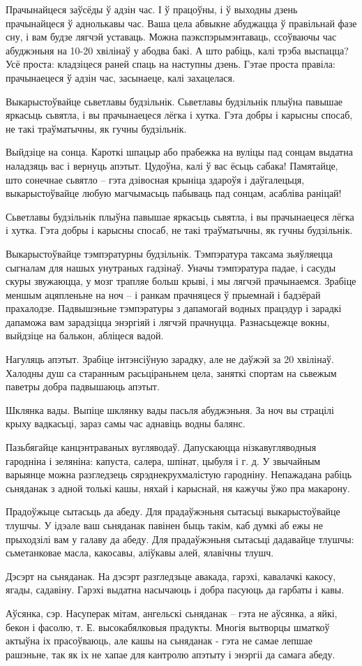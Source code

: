 Прачынайцеся заўсёды ў адзін час.
І ў працоўны, і ў выходны дзень прачынайцеся ў аднолькавы час. Ваша цела абвыкне абуджацца ў правільнай фазе сну, і вам будзе лягчэй уставаць. Можна паэкспэрымэнтаваць, ссоўваючы час абуджэньня на 10-20 хвілінаў у абодва бакі. А што рабіць, калі трэба выспацца? Усё проста: кладзіцеся раней спаць на наступны дзень. Гэтае проста правіла: прачынаецеся ў адзін час, засынаеце, калі захацелася.

Выкарыстоўвайце сьветлавы будзільнік.
Сьветлавы будзільнік плыўна павышае яркасьць сьвятла, і вы прачынаецеся лёгка і хутка. Гэта добры і карысны спосаб, не такі траўматычны, як гучны будзільнік.

Выйдзіце на сонца.
Кароткі шпацыр або прабежка на вуліцы пад сонцам выдатна наладзяць вас і вернуць апэтыт. Цудоўна, калі ў вас ёсьць сабака! Памятайце, што сонечнае сьвятло – гэта дзівосная крыніца здароўя і даўгалецьця, выкарыстоўвайце любую магчымасьць пабываць пад сонцам, асабліва раніцай!

Сьветлавы будзільнік плыўна павышае яркасьць сьвятла, і вы прачынаецеся лёгка і хутка. Гэта добры і карысны спосаб, не такі траўматычны, як гучны будзільнік.

Выкарыстоўвайце тэмпэратурны будзільнік.
Тэмпэратура таксама зьяўляецца сыгналам для нашых унутраных гадзінаў. Уначы тэмпэратура падае, і сасуды скуры звужаюцца, у мозг трапляе больш крыві, і мы лягчэй прачынаемся. Зрабіце меншым ацяпленьне на ноч – і ранкам прачняцеся ў прыемнай і бадзёрай прахалодзе. Падвышэньне тэмпэратуры з дапамогай водных працэдур і зарадкі дапаможа вам зарадзіцца энэргіяй і лягчэй прачнуцца. Разнасьцежце вокны, выйдзіце на балькон, абліцеся вадой.

Нагуляць апэтыт.
Зрабіце інтэнсіўную зарадку, але не даўжэй за 20 хвілінаў. Халодны душ са старанным расьціраньнем цела, заняткі спортам на сьвежым паветры добра падвышаюць апэтыт.

Шклянка вады.
Выпіце шклянку вады пасьля абуджэньня. За ноч вы страцілі крыху вадкасьці, зараз самы час аднавіць водны балянс.

Пазьбягайце канцэнтраваных вугляводаў.
Дапускаюцца нізкавугляводныя гародніна і зеляніна: капуста, салера, шпінат, цыбуля і г. д. У звычайным варыянце можна разгледзець сярэднекрухмалістую гародніну. Непажадана рабіць сьняданак з адной толькі кашы, няхай і карыснай, ня кажучы ўжо пра макарону.

Прадоўжыце сытасьць да абеду.
Для прадаўжэньня сытасьці выкарыстоўвайце тлушчы. У ідэале ваш сьняданак павінен быць такім, каб думкі аб ежы не прыходзілі вам у галаву да абеду. Для прадаўжэньня сытасьці дадавайце тлушчы: сьметанковае масла, какосавы, аліўкавы алей, ялавічны тлушч.

Дэсэрт на сьняданак.
На дэсэрт разгледзьце авакада, гарэхі, кавалачкі какосу, ягады, садавіну. Гарэхі выдатна насычаюць і добра пасуюць да гарбаты і кавы.

Аўсянка, сэр.
Насуперак мітам, ангельскі сьняданак – гэта не аўсянка, а яйкі, бекон і фасолю, т. Е. высокабялковыя прадукты. Многія вытворцы шматкоў актыўна іх прасоўваюць, але кашы на сьняданак - гэта не самае лепшае рашэньне, так як іх не хапае для кантролю апэтыту і энэргіі да самага абеду.
